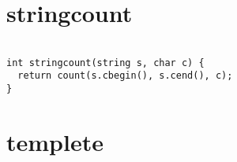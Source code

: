 \documentclass{jsarticle}
\begin{document}
\color{white}
\section{stringcount}
\color{black}
\begin{lstlisting}[caption=stringcount]

int stringcount(string s, char c) {
  return count(s.cbegin(), s.cend(), c);
}

\end{lstlisting}

\color{white}
\section{templete}
\color{black}
\begin{lstlisting}[caption=templete]


\end{lstlisting}
\end{document}
